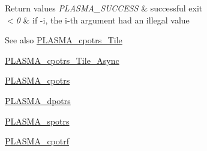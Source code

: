 \begin{DoxyRetVals}{Return values}
{\em P\+L\+A\+S\+M\+A\+\_\+\+S\+U\+C\+C\+E\+S\+S} & successful exit \\
\hline
{\em $<$0} & if -\/i, the i-\/th argument had an illegal value\\
\hline
\end{DoxyRetVals}
\begin{DoxySeeAlso}{See also}
\hyperlink{group__PLASMA__Complex32__t__Tile_ga8230c4eb5d95075765fa93102095249b_ga8230c4eb5d95075765fa93102095249b}{P\+L\+A\+S\+M\+A\+\_\+cpotrs\+\_\+\+Tile} 

\hyperlink{group__PLASMA__Complex32__t__Tile__Async_ga8aa2a4ca0bb58c03867ff4786c53ba01_ga8aa2a4ca0bb58c03867ff4786c53ba01}{P\+L\+A\+S\+M\+A\+\_\+cpotrs\+\_\+\+Tile\+\_\+\+Async} 

\hyperlink{group__PLASMA__Complex32__t_gaf429b7116507625912226d3c91bdfecc_gaf429b7116507625912226d3c91bdfecc}{P\+L\+A\+S\+M\+A\+\_\+cpotrs} 

\hyperlink{group__double_ga2d3c0509f11f1e9a9cf06b95109e62f5_ga2d3c0509f11f1e9a9cf06b95109e62f5}{P\+L\+A\+S\+M\+A\+\_\+dpotrs} 

\hyperlink{group__float_gab813bd6d81c21feae7ce6553c9ba255a_gab813bd6d81c21feae7ce6553c9ba255a}{P\+L\+A\+S\+M\+A\+\_\+spotrs} 

\hyperlink{group__PLASMA__Complex32__t_ga9a02052646386252f5b41c09c8d18684_ga9a02052646386252f5b41c09c8d18684}{P\+L\+A\+S\+M\+A\+\_\+cpotrf} 
\end{DoxySeeAlso}
\hypertarget{group__PLASMA__Complex32__t_gac62cd0bd5b290a074c3af371972266a4_gac62cd0bd5b290a074c3af371972266a4}{}
